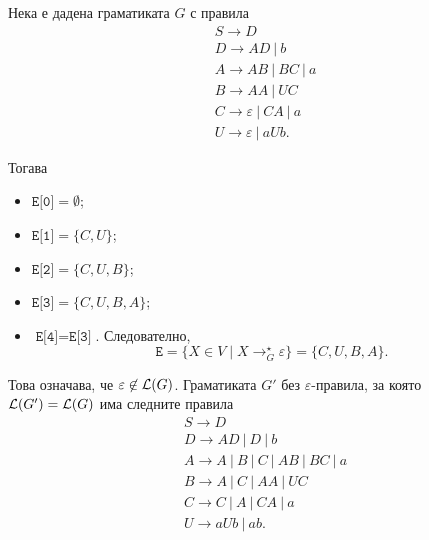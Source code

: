 {\scriptsize
\begin{multicols}{2}
  \begin{example}
  Нека е дадена граматиката $G$ с правила
  \begin{align*}
    & S \to D\\
    & D \to AD\ |\ b\\
    & A \to AB\ |\ BC\ |\ a\\
    & B \to AA\ |\ UC\\
    & C \to \varepsilon\ |\ CA\ |\ a\\
    & U \to \varepsilon\ |\ aUb.
  \end{align*}

  Тогава
  \begin{itemize}[-]
  \item
    $\texttt{E[0]} = \emptyset$;
  \item
    $\texttt{E[1]} = \{C,U\}$;
  \item
    $\texttt{E[2]} = \{C,U,B\}$;
  \item
    $\texttt{E[3]} = \{C,U,B,A\}$;
  \item
    $\texttt{E[4]} = \texttt{E[3]}$. Следователно,
    \[\texttt{E} = \{X \in V \mid X \rightarrow^\star_G \varepsilon\} = \{C,U,B,A\}.\]
  \end{itemize}
  
  Това означава, че $\varepsilon \not\in \mathcal{L}(G)$.
  Граматиката $G'$ без $\varepsilon$-правила, за която $\mathcal{L}(G') = \mathcal{L}(G)$ има следните правила
  \begin{align*}
    & S \to D \\
    & D\to AD\ |\ D\ |\ b \\
    & A \to A\ |\ B\ |\ C\ |\ AB\ |\ BC\ |\ a \\
    & B\to A\ |\ C\ |\ AA\ |\ UC\\
    & C \to C\ |\ A\ |\ CA\ |\ a\\
    & U \to aUb\ |\ ab.
  \end{align*}
\end{example}
\end{multicols}

}
